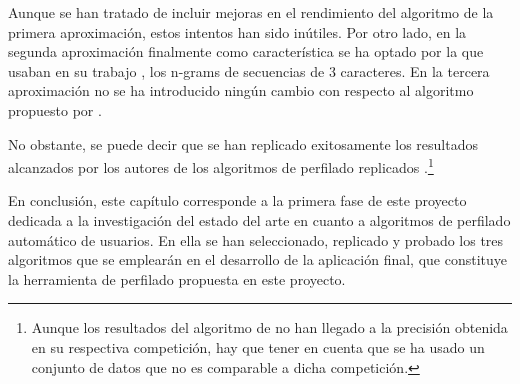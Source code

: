 Aunque se han tratado de incluir mejoras en el rendimiento del algoritmo de la primera aproximación, estos intentos han sido inútiles. Por otro lado, en la segunda aproximación finalmente como característica se ha optado por la que usaban en su trabajo \citet{grivas2015author}, los n-grams de secuencias de 3 caracteres. En la tercera aproximación no se ha introducido ningún cambio con respecto al algoritmo propuesto por \citet{modaresi:2016}.

No obstante, se puede decir que se han replicado exitosamente los resultados alcanzados por los autores de los algoritmos de perfilado replicados \citep{loscalis22, grivas2015author, modaresi:2016}.\footnote{Aunque los resultados del algoritmo de \citet{loscalis22} no han llegado a la precisión obtenida en su respectiva competición, hay que tener en cuenta que se ha usado un conjunto de datos que no es comparable a dicha competición.}

En conclusión, este capítulo corresponde a la primera fase de este proyecto dedicada a la investigación del estado del arte en cuanto a algoritmos de perfilado automático de usuarios. En ella se han seleccionado, replicado y probado los tres algoritmos que se emplearán en el desarrollo de la aplicación final, que constituye la herramienta de perfilado propuesta en este proyecto. %